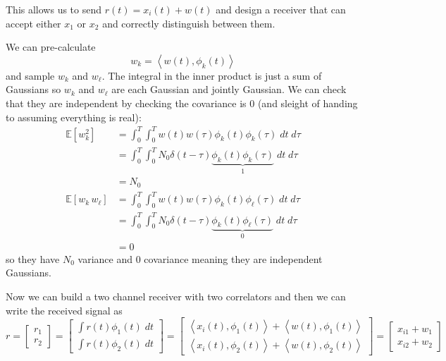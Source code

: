 \documentclass[12pt]{report}
\newcommand{\E}{\mathbb{E}}
\newcommand{\brak}[1]{\left\langle #1 \right\rangle}
\begin{document}
This allows us to send $r(t) = x_i(t) + w(t)$ and design a receiver that can accept either $x_1$ or $x_2$ and correctly distinguish between them.

We can pre-calculate 
\[w_k = \brak{w(t), \phi_k(t)}\] 
and sample $w_k$ and $w_{\ell}$. The integral in the inner product is just a sum of Gaussians so $w_k$ and $w_{\ell}$ are each Gaussian and jointly Gaussian. We can check that they are independent by checking the covariance is $0$ (and sleight of handing to assuming everything is real): 
\begin{align*}
    \E[w_k^2] &= \int_0^T \int_0^T w(t) w(\tau) \phi_k(t) \phi_k(\tau) \; dt \; d\tau\\ 
    &= \int_0^T \int_0^T N_0 \delta(t - \tau) \underbrace{\phi_k(t) \phi_k(\tau)}_{1} \; dt \; d\tau\\
    &= N_0\\
    \E[w_k\, w_{\ell}] &= \int_0^T \int_0^T w(t) w(\tau) \phi_k(t) \phi_{\ell}(\tau) \; dt \; d\tau\\ 
    &= \int_0^T \int_0^T N_0 \delta(t - \tau) \underbrace{\phi_k(t) \phi_{\ell}(\tau)}_{0} \; dt \; d\tau\\
    &= 0
\end{align*}
so they have $N_0$ variance and $0$ covariance meaning they are independent Gaussians.

Now we can build a two channel receiver with two correlators and then we can write the received signal as
\[ r = \begin{bmatrix}
        r_1\\ r_2
    \end{bmatrix} = \begin{bmatrix}
        \int r(t) \phi_1(t) \; dt\\ 
        \int r(t) \phi_2(t) \; dt
    \end{bmatrix} = \begin{bmatrix}
        \brak{x_i(t), \phi_1(t)} + \brak{w(t), \phi_1(t)}\\
        \brak{x_i(t), \phi_2(t)} + \brak{w(t), \phi_2(t)}
    \end{bmatrix} = \begin{bmatrix}
        x_{i1} + w_1\\ 
        x_{i2} + w_2
    \end{bmatrix}\]
   
\end{document}
